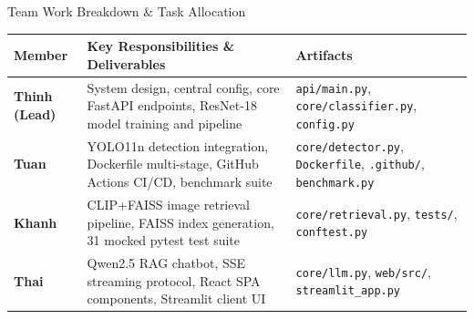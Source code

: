 \documentclass[aspectratio=169, 10pt]{beamer}
\begin{document}
\begin{frame}{Team Work Breakdown \& Task Allocation}
  \centering\small
  \begin{tabularx}{\textwidth}{lXp{3.2cm}}
    \toprule
    \textbf{Member} & \textbf{Key Responsibilities \& Deliverables} & \textbf{Artifacts} \\
    \midrule
    \textbf{Thinh (Lead)} & System design, central config, core FastAPI endpoints, ResNet-18 model training and pipeline & \texttt{api/main.py}, \texttt{core/classifier.py}, \texttt{config.py} \\
    \addlinespace
    \textbf{Tuan} & YOLO11n detection integration, Dockerfile multi-stage, GitHub Actions CI/CD, benchmark suite & \texttt{core/detector.py}, \texttt{Dockerfile}, \texttt{.github/}, \texttt{benchmark.py} \\
    \addlinespace
    \textbf{Khanh} & CLIP+FAISS image retrieval pipeline, FAISS index generation, 31 mocked pytest test suite & \texttt{core/retrieval.py}, \texttt{tests/}, \texttt{conftest.py} \\
    \addlinespace
    \textbf{Thai} & Qwen2.5 RAG chatbot, SSE streaming protocol, React SPA components, Streamlit client UI & \texttt{core/llm.py}, \texttt{web/src/}, \texttt{streamlit\_app.py} \\
    \bottomrule
  \end{tabularx}
\end{frame}
\end{document}
